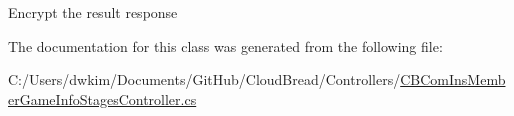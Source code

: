 Encrypt the result response 

The documentation for this class was generated from the following file\+:\begin{DoxyCompactItemize}
\item 
C\+:/\+Users/dwkim/\+Documents/\+Git\+Hub/\+Cloud\+Bread/\+Controllers/\hyperlink{a00121}{C\+B\+Com\+Ins\+Member\+Game\+Info\+Stages\+Controller.\+cs}\end{DoxyCompactItemize}
